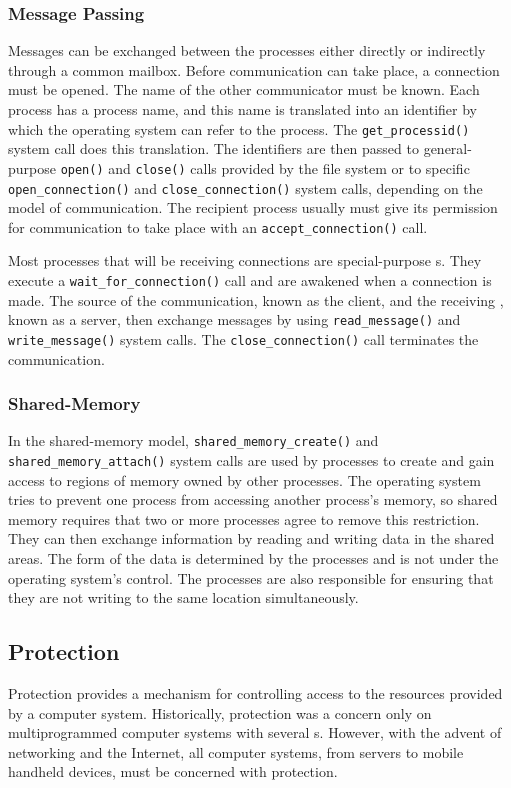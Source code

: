 \subsubsection{Message Passing}\label{subsubsec:Message_Passing}
Messages can be exchanged between the processes either directly or indirectly through a common mailbox.
Before communication can take place, a connection must be opened.
The name of the other communicator must be known.
Each process has a process name, and this name is translated into an identifier by which the operating system can refer to the process.
The \texttt{get_processid()} system call does this translation.
The identifiers are then passed to general-purpose \texttt{open()} and \texttt{close()} calls provided by the file system or to specific \texttt{open_connection()} and \texttt{close_connection()} system calls, depending on the model of communication.
The recipient process usually must give its permission for communication to take place with an \texttt{accept_connection()} call.

Most processes that will be receiving connections are special-purpose s.
They execute a \texttt{wait_for_connection()} call and are awakened when a connection is made.
The source of the communication, known as the client, and the receiving , known as a server, then exchange messages by using \texttt{read_message()} and \texttt{write_message()} system calls.
The \texttt{close_connection()} call terminates the communication.

\subsubsection{Shared-Memory}\label{subsubsec:Shared_Memory}
In the shared-memory model, \texttt{shared_memory_create()} and \texttt{shared_memory_attach()} system calls are used by processes to create and gain access to regions of memory owned by other processes.
The operating system tries to prevent one process from accessing another process’s memory, so shared memory requires that two or more processes agree to remove this restriction.
They can then exchange information by reading and writing data in the shared areas.
The form of the data is determined by the processes and is not under the operating system’s control.
The processes are also responsible for ensuring that they are not writing to the same location simultaneously.

\subsection{Protection}\label{subsec:Protection}
Protection provides a mechanism for controlling access to the resources provided by a computer system.
Historically, protection was a concern only on multiprogrammed computer systems with several s.
However, with the advent of networking and the Internet, all computer systems, from servers to mobile handheld devices, must be concerned with protection.

